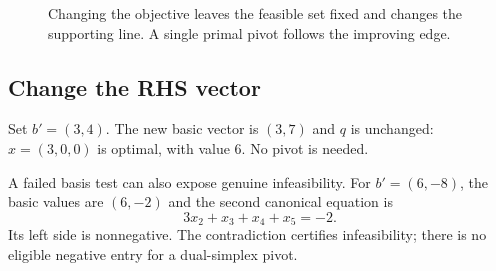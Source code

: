 \documentclass[11pt,a4paper]{article}
\begin{document}
\begin{figure}[H]\centering
  \caption{Changing the objective leaves the feasible set fixed and changes the
    supporting line. A single primal pivot follows the improving edge.}
\end{figure}

\subsection{Change the RHS vector}
Set $b'=(3,4)$. The new basic vector is $(3,7)$ and $q$ is unchanged:
$x=(3,0,0)$ is optimal, with value 6. No pivot is needed.

A failed basis test can also expose genuine infeasibility. For $b'=(6,-8)$,
the basic values are $(6,-2)$ and the second canonical equation is
\[
  3x_2+x_3+x_4+x_5=-2.
\]
Its left side is nonnegative. The contradiction certifies infeasibility;
there is no eligible negative entry for a dual-simplex pivot.
\end{document}
